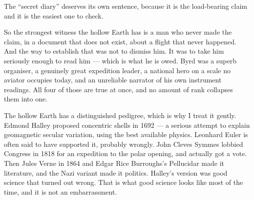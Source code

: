 The ``secret diary'' deserves its own sentence, because it is the load-bearing claim and it is the
easiest one to check.


So the strongest witness the hollow Earth has is a man who never made the claim, in a document that
does not exist, about a flight that never happened. And the way to establish that was not to
dismiss him. It was to take him seriously enough to read him --- which is what he is owed. Byrd was
a superb organiser, a genuinely great expedition leader, a national hero on a scale no aviator
occupies today, and an unreliable narrator of his own instrument readings. All four of those are
true at once, and no amount of rank collapses them into one.

\begin{funfact}
The hollow Earth has a distinguished pedigree, which is why I treat it gently. Edmond Halley
proposed concentric shells in 1692 --- a serious attempt to explain geomagnetic secular variation,
using the best available physics. Leonhard Euler is often said to have supported it, probably
wrongly. John Cleves Symmes lobbied Congress in 1818 for an expedition to the polar opening, and
actually got a vote. Then Jules Verne in 1864 and Edgar Rice Burroughs's Pellucidar made it
literature, and the Nazi variant made it politics. Halley's version was good science that turned
out wrong. That is what good science looks like most of the time, and it is not an embarrassment.
\end{funfact}


